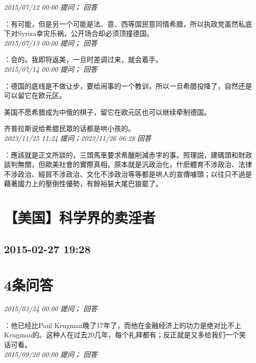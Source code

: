 \documentclass[twocolumn]{ctexart}
\begin{document}
\textit{\hfill\noindent\small 2015/07/12 00:00 提问； 回答}

：有可能，但是另一个可能是法、意、西等国民意同情希腊，所以执政党虽然私底下对Syriza幸灾乐祸，公开场合却必须顶撞德国。\\

\textit{\hfill\noindent\small 2015/07/13 00:00 提问； 回答}

：会的。我即将返美，一旦时差调过来，就会着手。\\

\textit{\hfill\noindent\small 2015/07/14 00:00 提问； 回答}

：德国的底线是不做让步，要给闹事的一个教训，所以一旦希腊投降了，自然还是可以留它在欧元区。

美国不愿希腊成为中俄的棋子，留它在欧元区也可以继续牵制德国。

齐普拉斯说给希腊民眾的话都是哄小孩的。\\

\textit{\hfill\noindent\small 2023/11/25 11:24 提问；2023/11/26 06:28 回答}

：應該就是正文所談的，三頭馬車要求希臘削減赤字的事。照理説，建碼頭和財政談判無關，但歐美社會的實際真相，原本就是汎政治化，什麽體育不涉政治、法律不涉政治、經貿不涉政治、文化不涉政治等等都是哄人的宣傳噱頭；以往只不過是藉著國力上的壓倒性優勢，有餘裕裝大尾巴狼罷了。
\\


\section{【美国】科学界的卖淫者}
\subsection{2015-02-27 19:28}


\section{4条问答}

\textit{\hfill\noindent\small 2015/03/24 00:00 提问； 回答}

：他已经比Paul Krugman晚了17年了，而他在金融经济上的功力是绝对比不上Krugman的。这种人在过去20几年，每个礼拜都有；反正就是又多给我们一个笑话可看。\\

\textit{\hfill\noindent\small 2015/09/20 00:00 提问； 回答}
\end{document}
